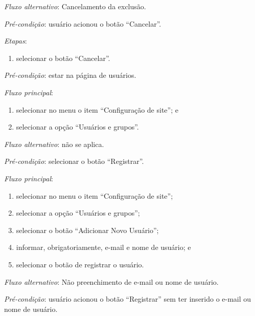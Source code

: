 \noindent \textit{Fluxo alternativo}: Cancelamento da exclusão.

\noindent \textit{Pré-condição}: usuário acionou o botão ``Cancelar''.

\noindent \textit{Etapas}:

\begin{enumerate}
    \item selecionar o botão ``Cancelar''.
\end{enumerate}



\vspace{0.7cm}

\noindent \textit{Pré-condição}: estar na página de usuários.

\noindent \textit{Fluxo principal}:

\begin{enumerate}
    \item selecionar no menu o item ``Configuração de site''; e
    \item selecionar a opção ``Usuários e grupos''.
\end{enumerate}

\noindent \textit{Fluxo alternativo}: não se aplica.



\vspace{0.7cm}

\noindent \textit{Pré-condição}: selecionar o botão ``Registrar''.

\noindent \textit{Fluxo principal}:

\begin{enumerate}
    \item selecionar no menu o item ``Configuração de site'';
    \item selecionar a opção ``Usuários e grupos'';
    \item selecionar o botão ``Adicionar Novo Usuário'';
    \item informar, obrigatoriamente, e-mail e nome de usuário; e
    \item selecionar o botão de registrar o usuário.
\end{enumerate}

\noindent \textit{Fluxo alternativo}: Não preenchimento de e-mail ou nome de usuário.

\noindent \textit{Pré-condição}: usuário acionou o botão ``Registrar'' sem ter inserido o e-mail ou nome de usuário.

